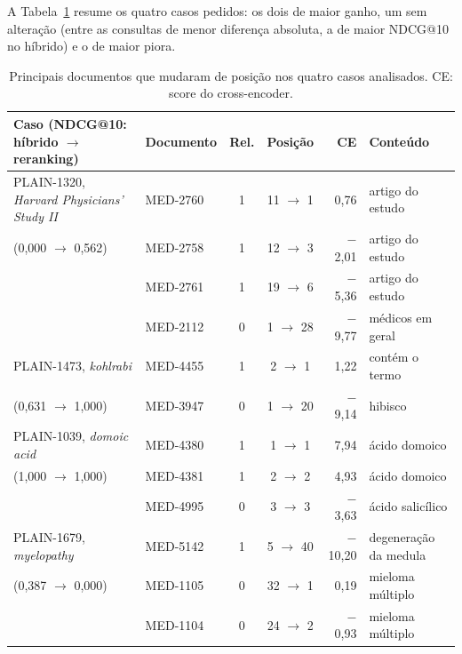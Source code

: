 \documentclass[11pt,a4paper]{article}
\begin{document}
A Tabela~\ref{tab:cecasos} resume os quatro casos pedidos: os dois de maior ganho, um sem alteração (entre as consultas de menor diferença absoluta, a de maior NDCG@10 no híbrido) e o de maior piora.

\begin{table}[!htb]
\centering\footnotesize
\setlength{\tabcolsep}{5pt}
\caption{Principais documentos que mudaram de posição nos quatro casos analisados. CE: score do cross-encoder.}
\label{tab:cecasos}
\begin{tabular}{llccrl}
\toprule
Caso (NDCG@10: híbrido $\rightarrow$ reranking) & Documento & Rel. & Posição & CE & Conteúdo \\
\midrule
PLAIN-1320, \emph{Harvard Physicians' Study II} & MED-2760 & 1 & 11 $\rightarrow$ 1 & 0,76 & artigo do estudo \\
(0,000 $\rightarrow$ 0,562) & MED-2758 & 1 & 12 $\rightarrow$ 3 & $-$2,01 & artigo do estudo \\
 & MED-2761 & 1 & 19 $\rightarrow$ 6 & $-$5,36 & artigo do estudo \\
 & MED-2112 & 0 & 1 $\rightarrow$ 28 & $-$9,77 & médicos em geral \\
\midrule
PLAIN-1473, \emph{kohlrabi} & MED-4455 & 1 & 2 $\rightarrow$ 1 & 1,22 & contém o termo \\
(0,631 $\rightarrow$ 1,000) & MED-3947 & 0 & 1 $\rightarrow$ 20 & $-$9,14 & hibisco \\
\midrule
PLAIN-1039, \emph{domoic acid} & MED-4380 & 1 & 1 $\rightarrow$ 1 & 7,94 & ácido domoico \\
(1,000 $\rightarrow$ 1,000) & MED-4381 & 1 & 2 $\rightarrow$ 2 & 4,93 & ácido domoico \\
 & MED-4995 & 0 & 3 $\rightarrow$ 3 & $-$3,63 & ácido salicílico \\
\midrule
PLAIN-1679, \emph{myelopathy} & MED-5142 & 1 & 5 $\rightarrow$ 40 & $-$10,20 & degeneração da medula \\
(0,387 $\rightarrow$ 0,000) & MED-1105 & 0 & 32 $\rightarrow$ 1 & 0,19 & mieloma múltiplo \\
 & MED-1104 & 0 & 24 $\rightarrow$ 2 & $-$0,93 & mieloma múltiplo \\
\bottomrule
\end{tabular}
\end{table}
\end{document}
